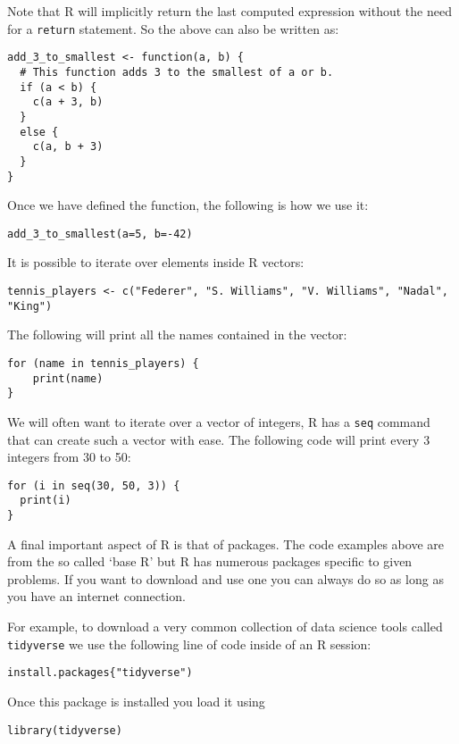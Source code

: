 Note that R will implicitly return the last computed expression without the need
for a \texttt{return} statement. So the above can also be written as:

\begin{verbatim}
add_3_to_smallest <- function(a, b) {
  # This function adds 3 to the smallest of a or b.
  if (a < b) {
    c(a + 3, b)
  }
  else {
    c(a, b + 3)
  }
}
\end{verbatim}

Once we have defined the function, the following is how we use it:

\begin{verbatim}
add_3_to_smallest(a=5, b=-42)
\end{verbatim}

It is possible to iterate over elements inside R vectors:

\begin{verbatim}
tennis_players <- c("Federer", "S. Williams", "V. Williams", "Nadal", "King")
\end{verbatim}

The following will print all the names contained in the vector:

\begin{verbatim}
for (name in tennis_players) {
    print(name)
}
\end{verbatim}

We will often want to iterate over a vector of integers, R has a \texttt
{seq}
command that can create such a vector with ease. The following
code will print every 3 integers from 30 to 50:


\begin{verbatim}
for (i in seq(30, 50, 3)) {
  print(i)
}
\end{verbatim}

A final important aspect of R is that of packages. The code examples above
are from the so called `base R' but R has numerous packages
specific to given problems. If you want to download and use one you can always
do so as long as you have an internet connection.

For example, to download a very common collection of data science tools called
\texttt{tidyverse}
we use the following line of code inside of an R session:

\begin{verbatim}
install.packages{"tidyverse")
\end{verbatim}

Once this package is installed you load it using

\begin{verbatim}
library(tidyverse)
\end{verbatim}
